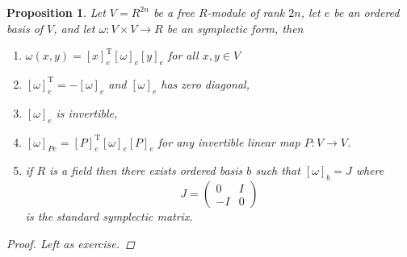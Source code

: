 \documentclass[10pt]{book}
\theoremstyle{bookplain}
\newtheorem{proposition}[theorem]{Proposition}
\theoremstyle{bookdefinition}
\theoremstyle{bookremark}
\begin{document}
\begin{proposition}Let $V=R^{2n}$ be a free $R$-module of rank $2n$, let $e$ be an ordered basis of $V$, and let $\omega:V\times V\rightarrow R$ be an symplectic form, then
    \begin{enumerate}
        \item $\omega(x,y)=[x]_{e}^\mathrm{T} [\omega]_e [y]_e$ for all $x,y\in V$
        \item $[\omega]_e^{\mathrm{T}}=-[\omega]_e$ and $[\omega]_e$ has zero diagonal, 
        \item  $[\omega]_e$ is invertible,
        \item $[\omega]_{Pe}=[P]^{\mathrm{T}}_e[\omega]_e[P]_e$ for any invertible linear map $P:V\rightarrow V$.
        \item if $R$ is a field then there exists ordered basis $b$ such that $[\omega]_b=J$ where 
        \[J=\begin{pmatrix}0&I\\ -I& 0\end{pmatrix}\]
        is the standard symplectic matrix.
    \end{enumerate}
    \begin{proof}Left as exercise.
    \end{proof}
\end{proposition}
\end{document}
